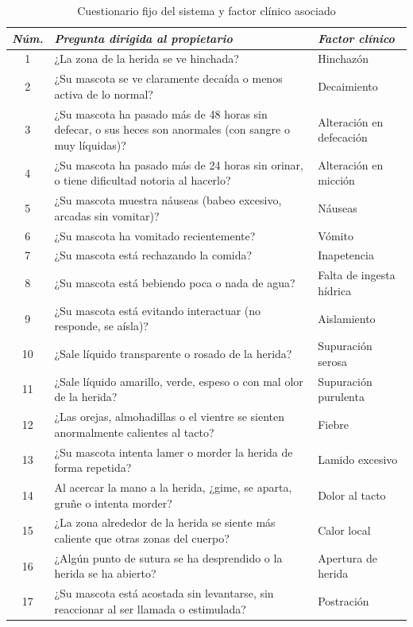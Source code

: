 \documentclass[stu, spanish]{apa7}
\begin{document}
\begin{table}[htbp]
\caption{Cuestionario fijo del sistema y factor cl\'{i}nico asociado}
\label{tab:preguntas}
\footnotesize
\begin{tabular}{@{}cp{8.5cm}l@{}}
\toprule
\textit{N\'{u}m.} & \textit{Pregunta dirigida al propietario} & \textit{Factor cl\'{i}nico} \\
\midrule
1 & ¿La zona de la herida se ve hinchada? & Hinchaz\'{o}n \\
2 & ¿Su mascota se ve claramente decaída o menos activa de lo normal? & Decaimiento \\
3 & ¿Su mascota ha pasado m\'{a}s de 48 horas sin defecar, o sus heces son anormales (con sangre o muy l\'{i}quidas)? & Alteraci\'{o}n en defecaci\'{o}n \\
4 & ¿Su mascota ha pasado m\'{a}s de 24 horas sin orinar, o tiene dificultad notoria al hacerlo? & Alteraci\'{o}n en micci\'{o}n \\
5 & ¿Su mascota muestra n\'{a}useas (babeo excesivo, arcadas sin vomitar)? & N\'{a}useas \\
6 & ¿Su mascota ha vomitado recientemente? & V\'{o}mito \\
7 & ¿Su mascota est\'{a} rechazando la comida? & Inapetencia \\
8 & ¿Su mascota est\'{a} bebiendo poca o nada de agua? & Falta de ingesta h\'{i}drica \\
9 & ¿Su mascota est\'{a} evitando interactuar (no responde, se a\'{i}sla)? & Aislamiento \\
10 & ¿Sale l\'{i}quido transparente o rosado de la herida? & Supuraci\'{o}n serosa \\
11 & ¿Sale l\'{i}quido amarillo, verde, espeso o con mal olor de la herida? & Supuraci\'{o}n purulenta \\
12 & ¿Las orejas, almohadillas o el vientre se sienten anormalmente calientes al tacto? & Fiebre \\
13 & ¿Su mascota intenta lamer o morder la herida de forma repetida? & Lamido excesivo \\
14 & Al acercar la mano a la herida, ¿gime, se aparta, gru\~{n}e o intenta morder? & Dolor al tacto \\
15 & ¿La zona alrededor de la herida se siente m\'{a}s caliente que otras zonas del cuerpo? & Calor local \\
16 & ¿Alg\'{u}n punto de sutura se ha desprendido o la herida se ha abierto? & Apertura de herida \\
17 & ¿Su mascota est\'{a} acostada sin levantarse, sin reaccionar al ser llamada o estimulada? & Postraci\'{o}n \\

\end{tabular}
\end{table}
\end{document}
